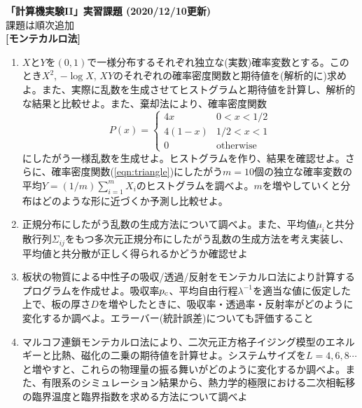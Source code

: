 \documentclass[11pt]{jarticle}
\begin{document}
\noindent
{\bf\large 「計算機実験II」実習課題 (2020/12/10更新)}
\\[-0.5em]

\noindent
課題は順次追加\\[-0.5em]


{\bf [モンテカルロ法]}
\begin{enumerate}

\item $X$と$Y$を$(0,1)$で一様分布するそれぞれ独立な(実数)確率変数とする。このとき$X^2$, $-\log X$, $XY$のそれぞれの確率密度関数と期待値を(解析的に)求めよ。また、実際に乱数を生成させてヒストグラムと期待値を計算し、解析的な結果と比較せよ。また、棄却法により、確率密度関数
  \begin{equation}
    P(x) = \begin{cases} 4x & 0 < x < 1/2 \\
      4(1-x) & 1/2 < x < 1 \\
      0 & \text{otherwise}
    \end{cases}
    \label{eqn:triangle}
  \end{equation}
  にしたがう一様乱数を生成せよ。ヒストグラムを作り、結果を確認せよ。さらに、確率密度関数(\ref{eqn:triangle})にしたがう$m=10$個の独立な確率変数の平均$Y=(1/m) \sum_{i=1}^m X_i$のヒストグラムを調べよ。$m$を増やしていくと分布はどのような形に近づくか予測し比較せよ。
  
\item 正規分布にしたがう乱数の生成方法について調べよ。また、平均値$\mu_i$と共分散行列$\Sigma_{ij}$をもつ多次元正規分布にしたがう乱数の生成方法を考え実装し、平均値と共分散が正しく得られるかどうか確認せよ

\item 板状の物質による中性子の吸収/透過/反射をモンテカルロ法により計算するプログラムを作成せよ。吸収率$p_{\rm c}$、平均自由行程$\lambda^{-1}$を適当な値に仮定した上で、板の厚さ$D$を増やしたときに、吸収率・透過率・反射率がどのように変化するか調べよ。エラーバー(統計誤差)についても評価すること

\item マルコフ連鎖モンテカルロ法により、二次元正方格子イジング模型のエネルギーと比熱、磁化の二乗の期待値を計算せよ。システムサイズを$L=4, 6,8\cdots$と増やすと、これらの物理量の振る舞いがどのように変化するか調べよ。また、有限系のシミュレーション結果から、熱力学的極限における二次相転移の臨界温度と臨界指数を求める方法について調べよ


\end{enumerate}
\end{document}

